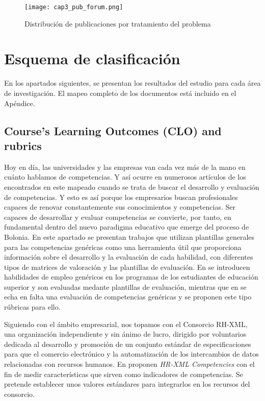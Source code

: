 \begin{figure}[H]
  \begin{center}
    \texttt{[image: cap3\_pub\_forum.png]}
  \end{center}
  \caption{Distribución de publicaciones por tratamiento del problema}
  \label{fig:PublicacionesForum}
\end{figure}


\section{Esquema de clasificación}

En los apartados siguientes, se presentan los resultados del estudio para cada área de investigación. El mapeo completo de los documentos está incluido en el Apéndice.

\subsection{Course’s Learning Outcomes (CLO) and rubrics}
Hoy en día, las universidades y las empresas van cada vez más de la mano en cuánto hablamos de competencias. Y así ocurre en numerosos artículos de los encontrados en este mapeado cuando se trata de buscar el desarrollo y evaluación de competencias. Y esto es así porque los empresarios buscan profesionales capaces de renovar constantemente sus conocimientos y competencias. Ser capaces de desarrollar y evaluar competencias se convierte, por tanto, en fundamental dentro del nuevo paradigma educativo que emerge del proceso de Bolonia. En este apartado se presentan trabajos que utilizan plantillas generales para las competencias genéricas como una herramienta útil que proporciona información sobre el desarrollo y la evaluación de cada habilidad, con diferentes tipos de matrices de valoración y las plantillas de evaluación. En \cite{Terron-Lopez:2013} se introducen habilidades de empleo genéricos en los programas de los estudiantes de educación superior y son evaluadas medante plantillas de evaluación, mientras que en \cite{Feldt:2009} se echa en falta una evaluación de competencias genéricas y se proponen este tipo rúbricas para ello.

Siguiendo con el ámbito empresarial, nos topamos con el Consorcio RH-XML, una organización independiente y sin ánimo de lucro, dirigido por voluntarios dedicada al desarrollo y promoción de un conjunto estándar de especificaciones para que el comercio electrónico y la automatización de los intercambios de datos relacionadas con recursos humanos. En \cite{Adelsberger:2008} proponen \emph{HR-XML Competencies} con el fin de medir características que sirven como indicadores de competencias. Se pretende establecer unos valores estándares para integrarlos en los recursos del consorcio.

